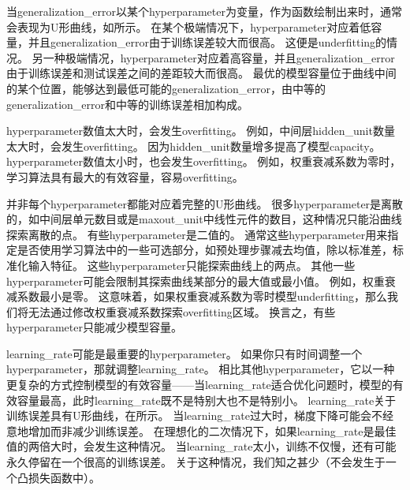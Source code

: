当\gls{generalization_error}以某个\gls{hyperparameter}为变量，作为函数绘制出来时，通常会表现为U形曲线，如所示。
在某个极端情况下，\gls{hyperparameter}对应着低容量，并且\gls{generalization_error}由于训练误差较大而很高。
这便是\gls{underfitting}的情况。
另一种极端情况，\gls{hyperparameter}对应着高容量，并且\gls{generalization_error}由于训练误差和测试误差之间的差距较大而很高。
最优的模型容量位于曲线中间的某个位置，能够达到最低可能的\gls{generalization_error}，由中等的\gls{generalization_error}和中等的训练误差相加构成。



\gls{hyperparameter}数值太大时，会发生\gls{overfitting}。
例如，中间层\gls{hidden_unit}数量太大时，会发生\gls{overfitting}。
因为\gls{hidden_unit}数量增多提高了模型\gls{capacity}。
\gls{hyperparameter}数值太小时，也会发生\gls{overfitting}。
例如，权重衰减系数为零时，学习算法具有最大的有效容量，容易\gls{overfitting}。

并非每个\gls{hyperparameter}都能对应着完整的U形曲线。
很多\gls{hyperparameter}是离散的，如中间层单元数目或是\gls{maxout_unit}中线性元件的数目，这种情况只能沿曲线探索离散的点。
有些\gls{hyperparameter}是二值的。
通常这些\gls{hyperparameter}用来指定是否使用学习算法中的一些可选部分，如预处理步骤减去均值，除以标准差，标准化输入特征。
这些\gls{hyperparameter}只能探索曲线上的两点。
其他一些\gls{hyperparameter}可能会限制其探索曲线某部分的最大值或最小值。
例如，权重衰减系数最小是零。
这意味着，如果权重衰减系数为零时模型\gls{underfitting}，那么我们将无法通过修改权重衰减系数探索\gls{overfitting}区域。
换言之，有些\gls{hyperparameter}只能减少模型容量。



\gls{learning_rate}可能是最重要的\gls{hyperparameter}。
如果你只有时间调整一个\gls{hyperparameter}，那就调整\gls{learning_rate}。
相比其他\gls{hyperparameter}，它以一种更复杂的方式控制模型的有效容量——当\gls{learning_rate}适合优化问题时，模型的有效容量最高，此时\gls{learning_rate}既不是特别大也不是特别小。
\gls{learning_rate}关于训练误差具有U形曲线，在所示。
当\gls{learning_rate}过大时，梯度下降可能会不经意地增加而非减少训练误差。
在理想化的二次情况下，如果\gls{learning_rate}是最佳值的两倍大时，会发生这种情况\citep{LeCun+98backprop-small}。
当\gls{learning_rate}太小，训练不仅慢，还有可能永久停留在一个很高的训练误差。
关于这种情况，我们知之甚少（不会发生于一个凸损失函数中）。

